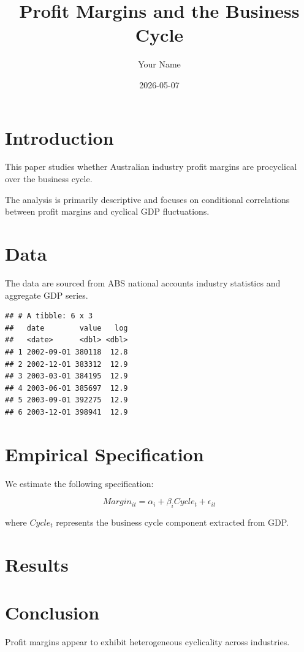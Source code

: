 \documentclass[
  11pt,
]{article}
\title{Profit Margins and the Business Cycle}
\author{Your Name}
\date{2026-05-07}
\begin{document}
\maketitle

{
\setcounter{tocdepth}{2}
\tableofcontents
}
\section{Introduction}\label{introduction}

This paper studies whether Australian industry profit margins are
procyclical over the business cycle.

The analysis is primarily descriptive and focuses on conditional
correlations between profit margins and cyclical GDP fluctuations.

\section{Data}\label{data}

The data are sourced from ABS national accounts industry statistics and
aggregate GDP series.

\begin{verbatim}
## # A tibble: 6 x 3
##   date        value   log
##   <date>      <dbl> <dbl>
## 1 2002-09-01 380118  12.8
## 2 2002-12-01 383312  12.9
## 3 2003-03-01 384195  12.9
## 4 2003-06-01 385697  12.9
## 5 2003-09-01 392275  12.9
## 6 2003-12-01 398941  12.9
\end{verbatim}

\section{Empirical Specification}\label{empirical-specification}

We estimate the following specification:

\[
Margin_{it} = \alpha_i + \beta_i Cycle_t + \epsilon_{it}
\]

where \(Cycle_t\) represents the business cycle component extracted from
GDP.

\section{Results}\label{results}

\section{Conclusion}\label{conclusion}

Profit margins appear to exhibit heterogeneous cyclicality across
industries.
\end{document}
